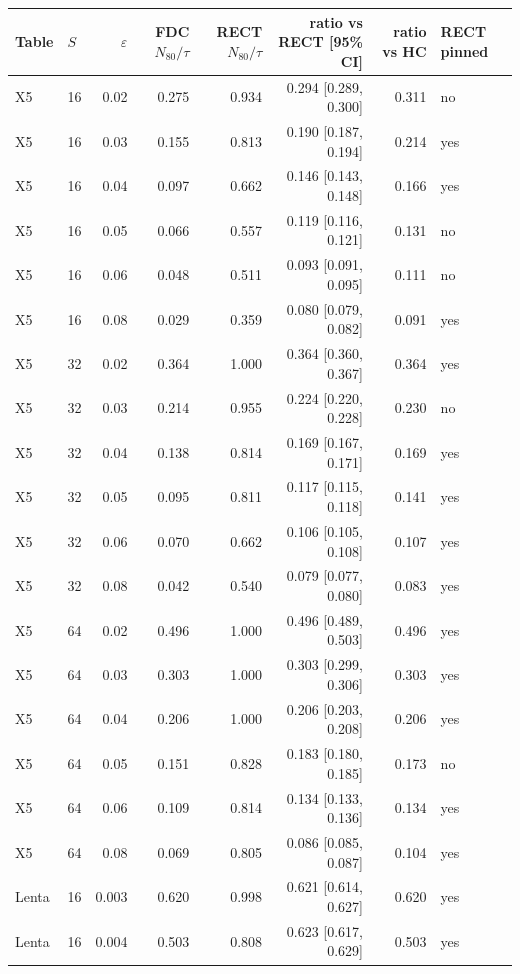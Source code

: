 \begin{tabular}{llrrrrrl}
\toprule
Table & $S$ & $\varepsilon$ & FDC $N_{80}/\tau$ & RECT $N_{80}/\tau$ & ratio vs RECT [95\% CI] & ratio vs HC & RECT pinned \\
\midrule
X5 & 16 & 0.02 & 0.275 & 0.934 & 0.294 [0.289, 0.300] & 0.311 & no \\
X5 & 16 & 0.03 & 0.155 & 0.813 & 0.190 [0.187, 0.194] & 0.214 & yes \\
X5 & 16 & 0.04 & 0.097 & 0.662 & 0.146 [0.143, 0.148] & 0.166 & yes \\
X5 & 16 & 0.05 & 0.066 & 0.557 & 0.119 [0.116, 0.121] & 0.131 & no \\
X5 & 16 & 0.06 & 0.048 & 0.511 & 0.093 [0.091, 0.095] & 0.111 & no \\
X5 & 16 & 0.08 & 0.029 & 0.359 & 0.080 [0.079, 0.082] & 0.091 & yes \\
\addlinespace
X5 & 32 & 0.02 & 0.364 & 1.000 & 0.364 [0.360, 0.367] & 0.364 & yes \\
X5 & 32 & 0.03 & 0.214 & 0.955 & 0.224 [0.220, 0.228] & 0.230 & no \\
X5 & 32 & 0.04 & 0.138 & 0.814 & 0.169 [0.167, 0.171] & 0.169 & yes \\
X5 & 32 & 0.05 & 0.095 & 0.811 & 0.117 [0.115, 0.118] & 0.141 & yes \\
X5 & 32 & 0.06 & 0.070 & 0.662 & 0.106 [0.105, 0.108] & 0.107 & yes \\
X5 & 32 & 0.08 & 0.042 & 0.540 & 0.079 [0.077, 0.080] & 0.083 & yes \\
\addlinespace
X5 & 64 & 0.02 & 0.496 & 1.000 & 0.496 [0.489, 0.503] & 0.496 & yes \\
X5 & 64 & 0.03 & 0.303 & 1.000 & 0.303 [0.299, 0.306] & 0.303 & yes \\
X5 & 64 & 0.04 & 0.206 & 1.000 & 0.206 [0.203, 0.208] & 0.206 & yes \\
X5 & 64 & 0.05 & 0.151 & 0.828 & 0.183 [0.180, 0.185] & 0.173 & no \\
X5 & 64 & 0.06 & 0.109 & 0.814 & 0.134 [0.133, 0.136] & 0.134 & yes \\
X5 & 64 & 0.08 & 0.069 & 0.805 & 0.086 [0.085, 0.087] & 0.104 & yes \\
\addlinespace
Lenta & 16 & 0.003 & 0.620 & 0.998 & 0.621 [0.614, 0.627] & 0.620 & yes \\
Lenta & 16 & 0.004 & 0.503 & 0.808 & 0.623 [0.617, 0.629] & 0.503 & yes \\

\end{tabular}

